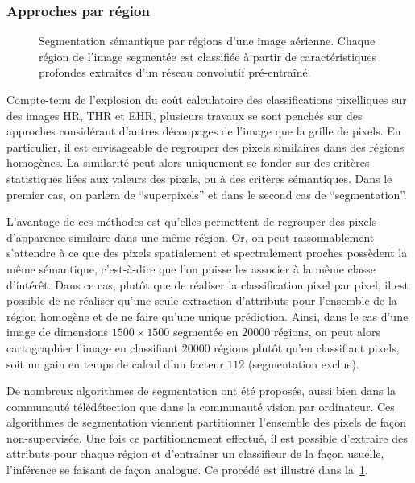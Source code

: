 \subsubsection{Approches par région}

\begin{figure}
\resizebox{\textwidth}{!}{%

}
\caption{Segmentation sémantique par régions d'une image aérienne. Chaque région de l'image segmentée est classifiée à partir de caractéristiques profondes extraites d'un réseau convolutif pré-entraîné.}
\label{fig:framework}
\end{figure}

Compte-tenu de l'explosion du coût calculatoire des classifications pixelliques sur des images \gls{HR}, \gls{THR} et \gls{EHR}, plusieurs travaux se sont penchés sur des approches considérant d'autres découpages de l'image que la grille de pixels. En particulier, il est envisageable de regrouper des pixels similaires dans des régions homogènes. La similarité peut alors uniquement se fonder sur des critères statistiques liées aux valeurs des pixels, ou à des critères sémantiques. Dans le premier cas, on parlera de ``superpixels'' et dans le second cas de ``segmentation''.

L'avantage de ces méthodes est qu'elles permettent de regrouper des pixels d'apparence similaire dans une même région. Or, on peut raisonnablement s'attendre à ce que des pixels spatialement et spectralement proches possèdent la même sémantique, c'est-à-dire que l'on puisse les associer à la même classe d'intérêt. Dans ce cas, plutôt que de réaliser la classification pixel par pixel, il est possible de ne réaliser qu'une seule extraction d'attributs pour l'ensemble de la région homogène et de ne faire qu'une unique prédiction. Ainsi, dans le cas d'une image de dimensions $1500\times1500$ segmentée en $20 000$ régions, on peut alors cartographier l'image en classifiant $20 000$ régions plutôt qu'en classifiant  pixels, soit un gain en temps de calcul d'un facteur $112$ (segmentation exclue).

De nombreux algorithmes de segmentation ont été proposés, aussi bien dans la communauté télédétection que dans la communauté vision par ordinateur. Ces algorithmes de segmentation viennent partitionner l'ensemble des pixels de façon non-supervisée. Une fois ce partitionnement effectué, il est possible d'extraire des attributs pour chaque région et d'entraîner un classifieur de la façon usuelle, l'inférence se faisant de façon analogue. Ce procédé est illustré dans la~\cref{fig:framework}.

